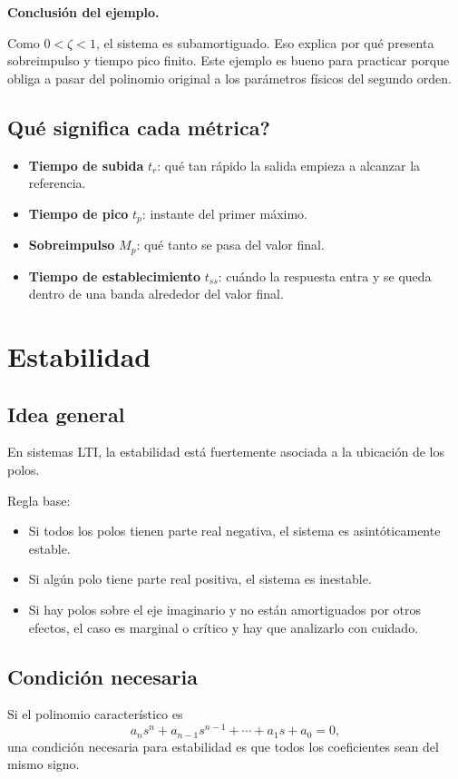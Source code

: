\documentclass[11pt]{article}
\begin{document}
\textbf{Conclusi\'on del ejemplo.}

Como $0<\zeta<1$, el sistema es subamortiguado. Eso explica por qu\'e presenta sobreimpulso y tiempo pico finito. Este ejemplo es bueno para practicar porque obliga a pasar del polinomio original a los par\'ametros f\'isicos del segundo orden.

\subsection{Qu\'e significa cada m\'etrica?}
\begin{itemize}
\item \textbf{Tiempo de subida} $t_r$: qu\'e tan r\'apido la salida empieza a alcanzar la referencia.
\item \textbf{Tiempo de pico} $t_p$: instante del primer m\'aximo.
\item \textbf{Sobreimpulso} $M_p$: qu\'e tanto se pasa del valor final.
\item \textbf{Tiempo de establecimiento} $t_{ss}$: cu\'ando la respuesta entra y se queda dentro de una banda alrededor del valor final.
\end{itemize}

\section{Estabilidad}
\subsection{Idea general}
En sistemas LTI, la estabilidad est\'a fuertemente asociada a la ubicaci\'on de los polos.

Regla base:
\begin{itemize}
\item Si todos los polos tienen parte real negativa, el sistema es asint\'oticamente estable.
\item Si alg\'un polo tiene parte real positiva, el sistema es inestable.
\item Si hay polos sobre el eje imaginario y no est\'an amortiguados por otros efectos, el caso es marginal o cr\'itico y hay que analizarlo con cuidado.
\end{itemize}

\subsection{Condici\'on necesaria}
Si el polinomio caracter\'istico es
\[
a_ns^n+a_{n-1}s^{n-1}+\cdots+a_1s+a_0=0,
\]
una condici\'on necesaria para estabilidad es que todos los coeficientes sean del mismo signo.
\end{document}
